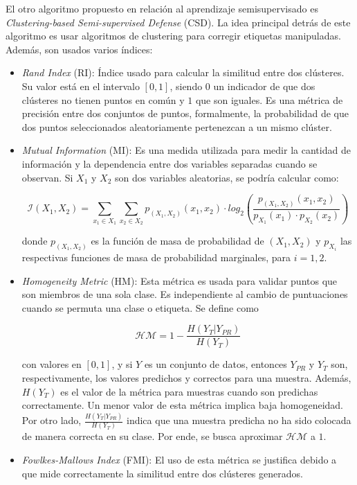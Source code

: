 El otro algoritmo propuesto en relación al aprendizaje semisupervisado es \textit{Clustering-based Semi-supervised Defense} (CSD). La idea principal detrás de este algoritmo es usar algoritmos de clustering para corregir etiquetas manipuladas. Además, son usados varios índices:

\begin{itemize}
	\item \textit{Rand Index} (RI): Índice  usado para calcular la similitud entre dos clústeres. Su valor está en el intervalo $[0,1]$, siendo $0$ un indicador de que dos clústeres no tienen puntos en común y $1$ que son iguales. Es una métrica de precisión entre dos conjuntos de puntos, formalmente, la probabilidad de que dos puntos seleccionados aleatoriamente pertenezcan a un mismo clúster.
	
	\item \textit{Mutual Information} (MI): Es una medida utilizada para medir la cantidad de información y la dependencia entre dos variables separadas cuando se observan. Si $X_1$ y $X_2$ son dos variables aleatorias, se podría calcular como:
	
	$$\mathcal{I}(X_1,X_2) = \sum_{x_1 \in X_1} \sum_{x_2 \in X_2} p_{(X_1,X_2)}(x_1,x_2) \cdot log_2 \left( \frac{p_{(X_1,X_2)}(x_1,x_2)}{p_{X_1}(x_1) \cdot p_{X_2}(x_2)} \right)$$
	
	donde $p_{(X_1,X_2)}$ es la función de masa de probabilidad de $(X_1,X_2)$ y $p_{X_i}$ las respectivas funciones de masa de probabilidad marginales, para $i=1,2$.
	
	\item \textit{Homogeneity Metric} (HM): Esta métrica es usada para validar puntos que son miembros de una sola clase. Es independiente al cambio de puntuaciones cuando se permuta una clase o etiqueta. Se define como
	
	$$\mathcal{HM} = 1 - \frac{H(Y_T | Y_{PR})}{H(Y_T)}$$
	
	con valores en $[0,1]$, y si $Y$ es un conjunto de datos, entonces $Y_{PR}$ y $Y_T$ son, respectivamente, los valores predichos y correctos para una muestra. Además, $H(Y_T)$ es el valor de la métrica para muestras cuando son predichas correctamente. Un menor valor de esta métrica implica baja homogeneidad. Por otro lado, $\frac{H(Y_T | Y_{PR})}{H(Y_T)}$ indica que una muestra predicha no ha sido colocada de manera correcta en su clase. Por ende, se busca aproximar $\mathcal{HM}$ a $1$.
	
	\item \textit{Fowlkes-Mallows Index} (FMI): El uso de esta métrica se justifica debido a que mide correctamente la similitud entre dos clústeres generados.
\end{itemize}

